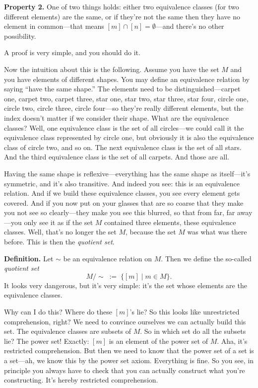 \textbf{Property 2.} One of two things holds: either two equivalence classes (for two different elements) are the same, or if they're not the same then they have no element in common---that means $[m] \cap [n] = \emptyset$---and there's no other possibility.

A proof is very simple, and you should do it.

Now the intuition about this is the following. Assume you have the set $M$ and you have elements of different shapes. You may define an equivalence relation by saying ``have the same shape.'' The elements need to be distinguished---carpet one, carpet two, carpet three, star one, star two, star three, star four, circle one, circle two, circle three, circle four---so they're really different elements, but the index doesn't matter if we consider their shape. What are the equivalence classes? Well, one equivalence class is the set of all circles---we could call it the equivalence class represented by circle one, but obviously it is also the equivalence class of circle two, and so on. The next equivalence class is the set of all stars. And the third equivalence class is the set of all carpets. And those are all.

Having the same shape is reflexive---everything has the same shape as itself---it's symmetric, and it's also transitive. And indeed you see: this is an equivalence relation. And if we build these equivalence classes, you see every element gets covered. And if you now put on your glasses that are so coarse that they make you not see so clearly---they make you see this blurred, so that from far, far away---you only see it as if the set $M$ contained three elements, these equivalence classes. Well, that's no longer the set $M$, because the set $M$ was what was there before. This is then the \emph{quotient set}.

\textbf{Definition.} Let $\sim$ be an equivalence relation on $M$. Then we define the so-called \emph{quotient set}
\[
M / {\sim} \;:=\; \{ [m] \mid m \in M \}.
\]
It looks very dangerous, but it's very simple: it's the set whose elements are the equivalence classes.

Why can I do this? Where do these $[m]$'s lie? So this looks like unrestricted comprehension, right? We need to convince ourselves we can actually build this set. The equivalence classes are subsets of $M$. So in which set do all the subsets lie? The power set! Exactly: $[m]$ is an element of the power set of $M$. Aha, it's restricted comprehension. But then we need to know that the power set of a set is a set---ah, we know this by the power set axiom. Everything is fine. So you see, in principle you always have to check that you can actually construct what you're constructing. It's hereby restricted comprehension.

